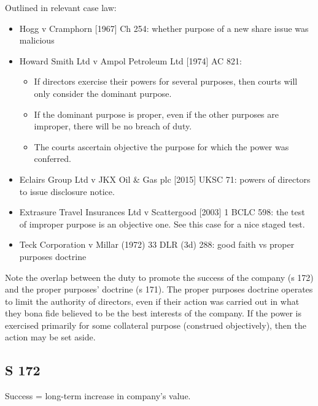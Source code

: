 \documentclass[
]{article}
\providecommand{\tightlist}{%
  \setlength{\itemsep}{0pt}\setlength{\parskip}{0pt}}
\begin{document}
Outlined in relevant case law:

\begin{itemize}
\tightlist
\item
  Hogg v Cramphorn {[}1967{]} Ch 254: whether purpose of a new share
  issue was malicious
\item
  Howard Smith Ltd v Ampol Petroleum Ltd {[}1974{]} AC 821:

  \begin{itemize}
  \tightlist
  \item
    If directors exercise their powers for several purposes, then courts
    will only consider the dominant purpose.
  \item
    If the dominant purpose is proper, even if the other purposes are
    improper, there will be no breach of duty.
  \item
    The courts ascertain objective the purpose for which the power was
    conferred.
  \end{itemize}
\item
  Eclairs Group Ltd v JKX Oil \& Gas plc {[}2015{]} UKSC 71: powers of
  directors to issue disclosure notice.
\item
  Extrasure Travel Insurances Ltd v Scattergood {[}2003{]} 1 BCLC 598:
  the test of improper purpose is an objective one. See this case for a
  nice staged test.
\item
  Teck Corporation v Millar (1972) 33 DLR (3d) 288: good faith vs proper
  purposes doctrine
\end{itemize}

Note the overlap between the duty to promote the success of the company
(s 172) and the proper purposes' doctrine (s 171). The proper purposes
doctrine operates to limit the authority of directors, even if their
action was carried out in what they bona fide believed to be the best
interests of the company. If the power is exercised primarily for some
collateral purpose (construed objectively), then the action may be set
aside.

\hypertarget{s-172}{%
\subsection{S 172}\label{s-172}}

Success = long-term increase in company's value.
\end{document}
